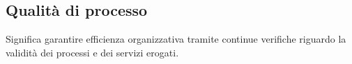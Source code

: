 \section{}
\subsection*{Qualità di processo} Significa garantire efficienza organizzativa tramite continue verifiche riguardo la validità dei processi e dei servizi erogati.
